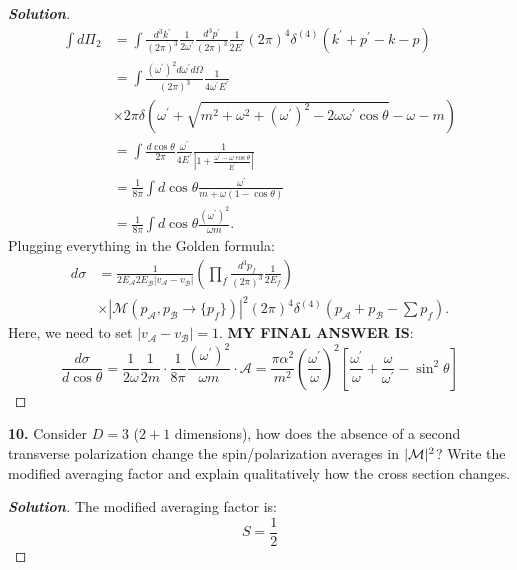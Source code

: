 \documentclass[11pt]{article}
\newenvironment{solution}[1][]{\begin{proof}[\textbf{Solution}]}{\end{proof}}
\begin{document}
\begin{solution}[14.9]
\[	\begin{aligned}\int d\Pi_{2}&=\int\frac{d^3k^{\prime}}{(2\pi)^3}\frac{1}{2\omega^{\prime}}\frac{d^3p^{\prime}}{(2\pi)^3}\frac{1}{2E^{\prime}}\left(2\pi\right)^4\delta^{(4)}(k^{\prime}+p^{\prime}-k-p)\\&=\int\frac{(\omega^{\prime})^2d\omega^{\prime}d\Omega}{(2\pi)^3}\frac{1}{4\omega^{\prime}E^{\prime}}\\&\times2\pi\delta(\omega^{\prime}+\sqrt{m^2+\omega^2+(\omega^{\prime})^2-2\omega\omega^{\prime}\cos\theta}-\omega-m)\\&=\int\frac{d\left.\cos\theta\right.}{2\pi}\frac{\omega^{\prime}}{4E^{\prime}}\frac{1}{\left|1+\frac{\omega^{\prime}-\omega\cos\theta}{E^{\prime}}\right|}\\&=\frac{1}{8\pi}\int d\left.\cos\theta\right.\frac{\omega^{\prime}}{m+\omega(1-\cos\theta)}\\&=\frac{1}{8\pi}\int d\cos\theta\frac{(\omega^{\prime})^{2}}{\omega m}.\end{aligned}
	\]
	Plugging everything in the Golden formula:
	\[
	\begin{aligned}
		d\sigma&=\frac{1}{2E_{\mathcal{A}}2E_{\mathcal{B}}\left|v_{\mathcal{A}}-v_{\mathcal{B}}\right|}\left(\prod_{f}\frac{d^{3}p_{f}}{(2\pi)^{3}}\frac{1}{2E_{f}}\right)\\&\times\left|\mathcal{M}(p_{\mathcal{A}},p_{\mathcal{B}}\to\{p_{f}\})\right|^{2}(2\pi)^{4}\delta^{(4)}(p_{\mathcal{A}}+p_{\mathcal{B}}-\sum p_{f}).
		\end{aligned}
	\]
	Here, we need to set $\left|v_{\mathcal{A}}-v_{\mathcal{B}}\right|=1$. \textbf{MY FINAL ANSWER IS}:
	\[
	\boxed{
	\frac{d\sigma}{d\cos\theta}=\frac{1}{2\omega}\frac{1}{2m}\cdot\frac{1}{8\pi}\frac{(\omega^{\prime})^2}{\omega m}\cdot\mathcal{A}=\frac{\pi\alpha^2}{m^2}\left(\frac{\omega^{\prime}}{\omega}\right)^2\left[\frac{\omega^{\prime}}{\omega}+\frac{\omega}{\omega^{\prime}}-\sin^2\theta\right]}
	\]
\end{solution}

\begin{tcolorbox}[problem]
\textbf{10.} Consider $D=3$ ($2+1$ dimensions), how does the absence of a second transverse polarization change the spin/polarization averages in $|{\cal M}|^2$? Write the modified averaging factor and explain qualitatively how the cross section changes.
\end{tcolorbox}
\begin{solution}[14.10]
	The modified averaging factor is:
	\[
	\boxed{
	S=\frac12
	}
	\]
\end{solution}
\end{document}
